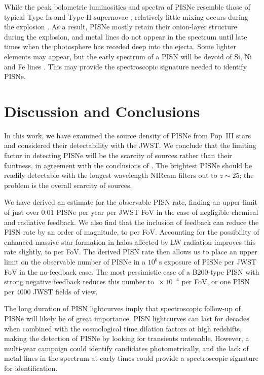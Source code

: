 \documentclass[../thesis.tex]{subfiles}
\begin{document}
While the peak bolometric luminosities and spectra of PISNe resemble
those of typical Type Ia and Type II supernovae
\citep{JoggerstWhalen2011, KasenWoosleyHeger2011}, relatively little
mixing occurs during the explosion \citep{JoggerstWhalen2011,
  ChenHegerAlmgren2011}.  As a result, PISNe mostly retain their
onion-layer structure during the explosion, and metal lines do not
appear in the spectrum until late times when the photosphere has
receded deep into the ejecta.  Some lighter elements may appear, but
the early spectrum of a PISN will be devoid of Si, Ni and Fe lines
\citep{JoggerstWhalen2011}. This may provide the spectroscopic
signature needed to identify PISNe.

\section{Discussion and Conclusions}
\label{pisn_conclusions} 
In this work, we have examined the source density of PISNe from
Pop~III stars and considered their detectability with the JWST. We
conclude that the limiting factor in detecting PISNe will be the
scarcity of sources rather than their faintness, in agreement with the
conclusions of \citet{WeinmannLilly2005}. The brightest PISNe should
be readily detectable with the longest wavelength NIRcam filters out
to $z\sim25$; the problem is the overall scarcity of sources.

 We have derived an estimate for the observable PISN rate, finding an
 upper limit of just over 0.01 PISNe per year per JWST FoV in the case
 of negligible chemical and radiative feedback. We also find that the
 inclusion of feedback can reduce the PISN rate by an order of
 magnitude, to  per FoV. Accounting for the possibility of
 enhanced massive star formation in halos affected by LW radiation improves
 this rate slightly, to  per FoV.  The derived PISN rate
 then allows us to place an upper limit on the observable number of
 PISNe in a $10^6\,$s exposure of  PISNe per JWST FoV in the
 no-feedback case. The most pessimistic case of a B200-type PISN with
 strong negative feedback reduces this number to
 $\,\times10^{-4}$ per FoV, or one PISN per 4000 JWST fields
 of view.

 The long duration of PISN lightcurves imply that spectroscopic
 follow-up of PISNe will likely be of great importance. PISN
 lightcurves can last for decades when combined with the cosmological
 time dilation factors at high redshifts, making the detection of
 PISNe by looking for transients untenable.  However, a multi-year
 campaign could identify candidates photometrically, and the lack of
 metal lines in the spectrum at early times could provide a
 spectroscopic signature for identification.
\end{document}
